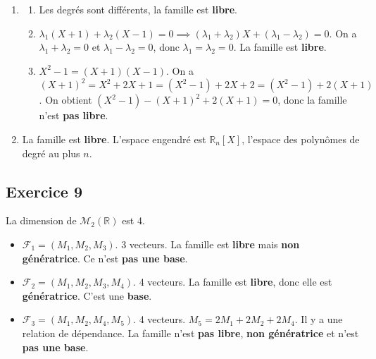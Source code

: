 \documentclass[french]{yLectureNote}
\newcommand{\R}[0]{\mathbb{R}}
\begin{document}
\begin{enumerate}
    Plus généralement, $Vect(P_{1},P_{2},P_{3})$ est l'ensemble des polynômes de la forme, avec \(A,B,V\in \R^3\) : \(A +2BX+BX^2+CX^3\).


    \item
    \begin{enumerate}
        \item Les degrés sont différents, la famille est \textbf{libre}.
        \item $\lambda_1(X+1)+\lambda_2(X-1)=0 \implies (\lambda_1+\lambda_2)X+(\lambda_1-\lambda_2)=0$. On a $\lambda_1+\lambda_2=0$ et $\lambda_1-\lambda_2=0$, donc $\lambda_1=\lambda_2=0$. La famille est \textbf{libre}.
        \item $X^2-1=(X+1)(X-1)$. On a $(X+1)^2 = X^2+2X+1 = (X^2-1)+2X+2 = (X^2-1)+2(X+1)$. On obtient $(X^2-1) - (X+1)^2 + 2(X+1) = 0$, donc la famille n'est \textbf{pas libre}.
    \end{enumerate}
    \item La famille est \textbf{libre}. L'espace engendré est $\mathbb{R}_n[X]$, l'espace des polynômes de degré au plus $n$.
\end{enumerate}

\subsection{Exercice 9}
La dimension de $\mathcal{M}_2(\mathbb{R})$ est 4.
\begin{itemize}
    \item $\mathcal{F}_{1}=(M_{1},M_{2},M_{3})$. 3 vecteurs. La famille est \textbf{libre} mais \textbf{non génératrice}. Ce n'est \textbf{pas une base}.
    \item $\mathcal{F}_{2}=(M_{1},M_{2},M_{3},M_{4})$. 4 vecteurs. La famille est \textbf{libre}, donc elle est \textbf{génératrice}. C'est une \textbf{base}.
    \item $\mathcal{F}_{3}=(M_{1},M_{2},M_{4},M_{5})$. 4 vecteurs. $M_5 = 2M_1+2M_2+2M_4$. Il y a une relation de dépendance. La famille n'est \textbf{pas libre}, \textbf{non génératrice} et n'est \textbf{pas une base}.
\end{itemize}
\end{document}
